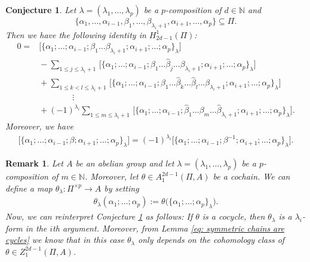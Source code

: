 \documentclass[pdftex]{sigma}
\numberwithin{equation}{section}
\newtheorem{conje}[Theorem]{Conjecture}
\newtheorem{Remark}[Theorem]{Remark}
\newcommand{\NN }{\mathbb{N}}
\begin{document}
\begin{conje} \label{conje: symmetrized cycles are n-forms in arguments}
 Let $\lambda=(\lambda_1,\dots,\lambda_p)$ be a $p$-composition of $d \in \NN$ and
 \[\{\alpha_1,\dots,\alpha_{i-1},\beta_1, \dots, \beta_{\lambda_{i}+1},\alpha_{i+1}, \dots ,\alpha_p\} \subseteq \Pi.\]
 Then we have the following identity in $H_{2d-1}^1(\Pi)$:
 \begin{align*}
 0={}&\big[\{\alpha_1;\dots;\alpha_{i-1};\beta_1\dots\beta_{\lambda_{i}+1};\alpha_{i+1}; \dots ;\alpha_p\}_\lambda \big] \\
 &{}-\sum_{1 \leq j \leq \lambda_{i}+1} \, \big[\{\alpha_1;\dots;\alpha_{i-1};\beta_1\dots \hat{\beta}_j\dots \beta_{\lambda_{i}+1};\alpha_{i+1}; \dots ;\alpha_p\}_\lambda \big] \\
 &{}+\sum_{1\leq k < l \leq \lambda_{i}+1} \, \big[\{\alpha_1;\dots;\alpha_{i-1};\beta_1\dots \hat{\beta}_k \dots \hat{\beta}_l\dots \beta_{\lambda_{i}+1};\alpha_{i+1}; \dots ;\alpha_p\}_\lambda \big]\\
 &\qquad\qquad\vdots\\
 &{}+(-1)^{\lambda_i}\sum_{1\leq m \leq \lambda_{i}+1}\, \big[\{\alpha_1;\dots;\alpha_{i-1};\hat{\beta}_1\dots \beta_m\dots \hat{\beta}_{\lambda_{i}+1};\alpha_{i+1}; \dots ;\alpha_p\}_\lambda \big].
 \end{align*}
 Moreover, we have
 \begin{align*}
 \big[\{\alpha_1;\dots;\alpha_{i-1};\beta;\alpha_{i+1}; \dots;\alpha_p\}_\lambda \big]=(-1)^{\lambda_i}\big[\big\{\alpha_1;\dots;\alpha_{i-1};\beta^{-1};\alpha_{i+1}; \dots;\alpha_p\big\}_\lambda \big].
 \end{align*}
\end{conje}

\begin{Remark}\label{rem: n-form}
 Let $A$ be an abelian group and let $\lambda=(\lambda_1,\dots,\lambda_p)$ be a $p$-composition of $m \in \NN$. Moreover, let $\theta \in A^{2d-1}_1(\Pi,A)$ be a cochain. We can define a map $\theta_\lambda\colon\Pi^{\times p} \to A$ by setting
 \begin{align*}
 \theta_\lambda(\alpha_1;\dots;\alpha_p):=\theta\big( \{\alpha_1;\dots;\alpha_p\}_\lambda\big).
 \end{align*}
 Now, we can reinterpret Conjecture \ref{conje: symmetrized cycles are n-forms in arguments} as follows: If $\theta$ is a cocycle, then $\theta_\lambda$ is a $\lambda_i$-form in the $i$th argument. Moreover, from Lemma \ref{eq: symmetric chains are cycles} we know that in this case $\theta_\lambda$ only depends on the cohomology class of $\theta \in Z^{2d-1}_1(\Pi,A)$.
\end{Remark}
\end{document}
